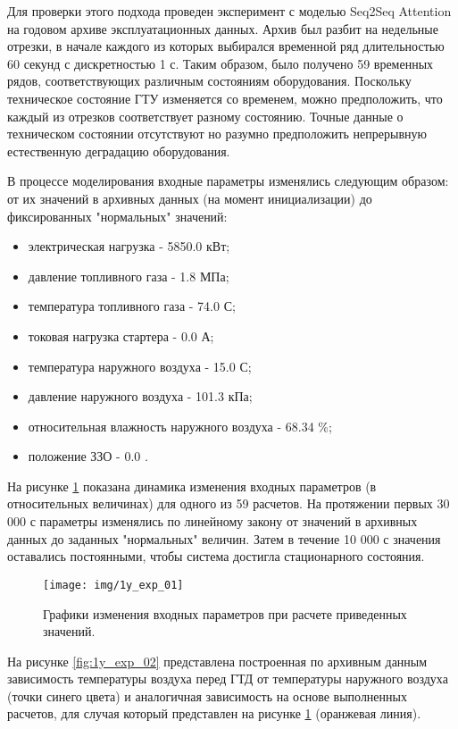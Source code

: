 \documentclass[12pt,a4paper]{article}
\begin{document}
Для проверки этого подхода проведен эксперимент с моделью Seq2Seq Attention на годовом архиве эксплуатационных данных. Архив был разбит на недельные отрезки, в начале каждого из которых выбирался временной ряд длительностью 60 секунд с дискретностью 1 с. Таким образом, было получено 59 временных рядов, соответствующих различным состояниям оборудования. Поскольку техническое состояние ГТУ изменяется со временем, можно предположить, что каждый из отрезков соответствует разному состоянию. Точные данные о техническом состоянии отсутствуют но разумно предположить непрерывную естественную деградацию оборудования.


В процессе моделирования входные параметры изменялись следующим образом: от их значений в архивных данных (на момент инициализации) до фиксированных "нормальных" значений:

\begin{itemize}
	\item электрическая нагрузка - 5850.0 кВт;
	\item давление топливного газа - 1.8 МПа;
	\item температура топливного газа - 74.0 \degree С;
	\item токовая нагрузка стартера - 0.0 А;
	\item температура наружного воздуха - 15.0 \degree С;
	\item давление наружного воздуха - 101.3 кПа;
	\item относительная влажность наружного воздуха - 68.34 \%;
	\item положение ЗЗО - 0.0 \degree.
\end{itemize}

На рисунке \ref{fig:1y_exp_01} показана динамика изменения входных параметров (в относительных величинах) для одного из 59 расчетов. На протяжении первых 30 000 с параметры изменялись по линейному закону от значений в архивных данных до заданных "нормальных" величин. Затем в течение 10 000 с значения оставались постоянными, чтобы система достигла стационарного состояния.

\begin{figure}[htbp]
	\centering\texttt{[image: img/1y\_exp\_01]}
	\caption{Графики изменения входных параметров при расчете приведенных значений.}
	\label{fig:1y_exp_01}
\end{figure}


На рисунке \ref{fig:1y_exp_02} представлена построенная по архивным данным зависимость температуры воздуха перед ГТД от температуры наружного воздуха (точки синего цвета) и аналогичная зависимость на основе выполненных расчетов, для случая который представлен на рисунке \ref{fig:1y_exp_01} (оранжевая линия).
\end{document}
